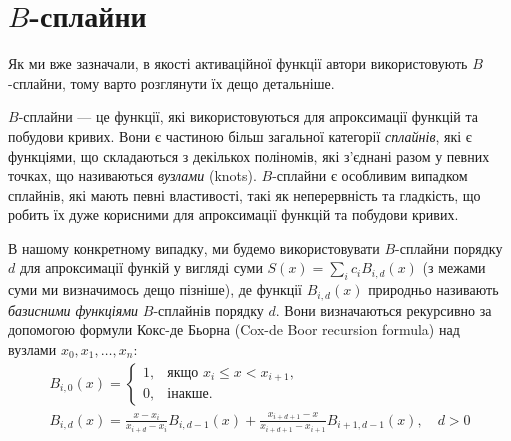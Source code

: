 \section{$B$-сплайни}

Як ми вже зазначали, в якості активаційної функції автори \cite{kan} 
використовують $B$-сплайни, тому варто розглянути їх дещо детальніше.

$B$-сплайни --- це функції, які використовуються для апроксимації
функцій та побудови кривих. Вони є частиною більш загальної категорії
\textit{сплайнів}, які є функціями, що складаються з декількох поліномів,
які з'єднані разом у певних точках, що називаються \textit{вузлами} (knots).
$B$-сплайни є особливим випадком сплайнів, які мають певні властивості,
такі як неперервність та гладкість, що робить їх дуже корисними для
апроксимації функцій та побудови кривих.

В нашому конкретному випадку, ми будемо використовувати $B$-сплайни порядку $d$
для апроксимації функій у вигляді суми $S(x) = \sum_{i}c_iB_{i,d}(x)$ (з межами
суми ми визначимось дещо пізніше), де функції $B_{i,d}(x)$ природньо називають
\textit{базисними функціями} $B$-сплайнів порядку $d$. Вони визначаються
рекурсивно за допомогою формули Кокс-де Бьорна (Cox-de Boor recursion formula)
\cite{b-splines} над вузлами $x_0, x_1, \ldots, x_n$:
\begin{gather}
    B_{i,0}(x) = \begin{cases}
        1, & \text{якщо } x_i \leq x < x_{i+1}, \\
        0, & \text{інакше.}
    \end{cases} \\
    B_{i,d}(x) = \frac{x-x_i}{x_{i+d}-x_i}B_{i,d-1}(x) + \frac{x_{i+d+1}-x}{x_{i+d+1}-x_{i+1}}B_{i+1,d-1}(x), \quad d > 0
\end{gather}

